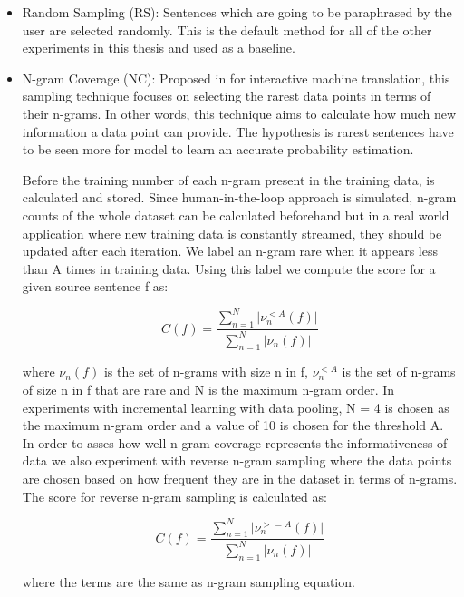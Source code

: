 \begin{itemize}

\item Random Sampling (RS): Sentences which are going to be paraphrased by the user are selected randomly. This is the default method for all of the other experiments in this thesis and used as a baseline.

\item N-gram Coverage (NC): Proposed in \cite{rubio} for interactive machine translation, this sampling technique focuses on selecting the rarest data points in terms of their n-grams. In other words, this technique aims to calculate how much new information a data point can provide. The hypothesis is rarest sentences have to be seen more for model to learn an accurate probability estimation. 

Before the training number of each n-gram present in the training data, is calculated and stored. Since human-in-the-loop approach is simulated, n-gram counts of the whole dataset can be calculated beforehand but in a real world application where new training data is constantly streamed, they should be updated after each iteration. We label an n-gram rare when it appears less than A times in training data. Using this label we compute the score for a given source sentence f as:

\begin{equation}
C(f) = \frac{\sum_{n=1}^N \lvert{\nu^{<A}_{n}(f)} \lvert} {\sum_{n=1}^N \lvert{\nu_{n}(f)} \lvert} 
\end{equation}


where ${\nu_{n}(f)}$ is the set of n-grams with size n in f, ${\nu^{<A}_{n}}$ is the set of n-grams of size n in f that are rare and N is the maximum n-gram order. In experiments with incremental learning with data pooling, N = 4 is chosen as the maximum n-gram order and a value of 10 is chosen for the threshold A. In order to asses how well n-gram coverage represents the informativeness of data we also experiment with reverse n-gram sampling where the data points are chosen based on how frequent they are in the dataset in terms of n-grams. The score for reverse n-gram sampling is calculated as:

\begin{equation}
C(f) = \frac{\sum_{n=1}^N \lvert{\nu^{>=A}_{n}(f)} \lvert} {\sum_{n=1}^N \lvert{\nu_{n}(f)} \lvert} 
\end{equation}

where the terms are the same as n-gram sampling equation.


\end{itemize}
